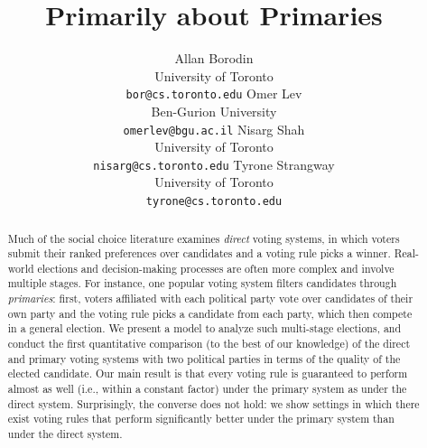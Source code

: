 \documentclass[letterpaper]{article} %
\theoremstyle{definition}
\begin{document}
\title{Primarily about Primaries}
\author{Allan Borodin\\University of Toronto\\\texttt{bor@cs.toronto.edu} \And Omer Lev\\Ben-Gurion University\\\texttt{omerlev@bgu.ac.il} \AND Nisarg Shah\\University of Toronto\\\texttt{nisarg@cs.toronto.edu} \And Tyrone Strangway\\University of Toronto\\\texttt{tyrone@cs.toronto.edu}}
\maketitle
\begin{abstract}
Much of the social choice literature examines \emph{direct} voting systems, in which voters submit their ranked preferences over candidates and a voting rule picks a winner. Real-world elections and decision-making processes are often more complex and involve multiple stages. For instance, one popular voting system filters candidates through \emph{primaries}: first, voters affiliated with each political party vote over candidates of their own party and the voting rule picks a candidate from each party, which then compete in a general election.
We present a model to analyze such multi-stage elections, and conduct the first quantitative comparison (to the best of our knowledge) of the direct and primary voting systems with two political parties in terms of the quality of the elected candidate. Our main result is that every voting rule is guaranteed to perform almost as well
(i.e., within a constant factor) under the primary system as under the direct system. Surprisingly, the converse does not hold: we show settings in which there exist voting rules that perform significantly better under the primary system than under the direct system.
\end{abstract}
\end{document}
